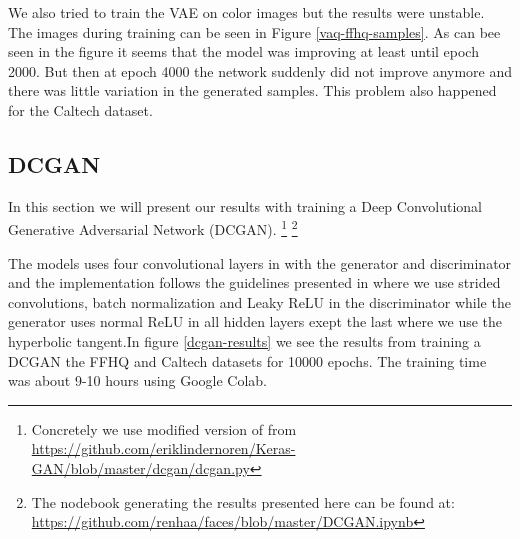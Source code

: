 We also tried to train the VAE on color images but the results were unstable. The images during training can be seen in Figure \ref{vaq-ffhq-samples}. As can bee seen in the figure it seems that the model was improving at least until epoch 2000. But then at epoch 4000 the network suddenly did not improve anymore and there was little variation in the generated samples. This problem also happened for the Caltech dataset.



\subsection{DCGAN}
In this section we will present our results with training a Deep Convolutional Generative Adversarial Network (DCGAN). \footnote{Concretely we use modified version of from \url{https://github.com/eriklindernoren/Keras-GAN/blob/master/dcgan/dcgan.py}} \footnote{The nodebook generating the results presented here can be found at: \url{https://github.com/renhaa/faces/blob/master/DCGAN.ipynb}}

The models uses four convolutional layers in with the generator and discriminator and the implementation follows the guidelines presented in \cite{dcgan} where we use strided convolutions, batch normalization and Leaky ReLU in the discriminator while the generator uses normal ReLU in all hidden layers exept the last where we use the hyperbolic tangent.In figure \ref{dcgan-results} we see the results from training a DCGAN the FFHQ and Caltech datasets for 10000 epochs. The training time was about 9-10 hours using Google Colab.

